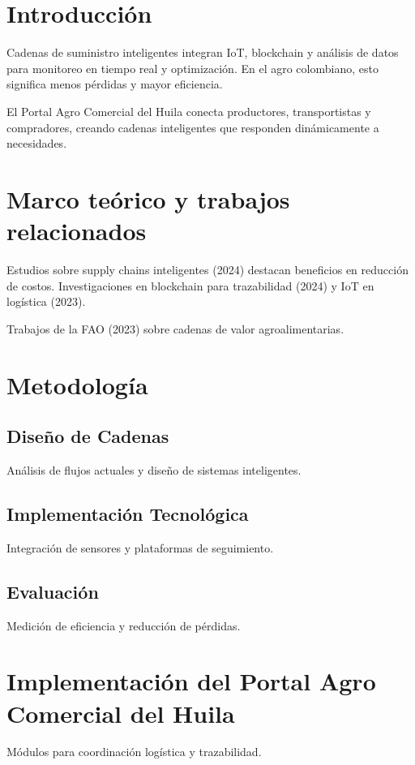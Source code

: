 \section{Introducción}

Cadenas de suministro inteligentes integran IoT, blockchain y análisis de datos para monitoreo en tiempo real y optimización. En el agro colombiano, esto significa menos pérdidas y mayor eficiencia.

El Portal Agro Comercial del Huila conecta productores, transportistas y compradores, creando cadenas inteligentes que responden dinámicamente a necesidades.

\section{Marco teórico y trabajos relacionados}

Estudios sobre supply chains inteligentes (2024) destacan beneficios en reducción de costos. Investigaciones en blockchain para trazabilidad (2024) y IoT en logística (2023).

Trabajos de la FAO (2023) sobre cadenas de valor agroalimentarias.

\section{Metodología}

\subsection{Diseño de Cadenas}
Análisis de flujos actuales y diseño de sistemas inteligentes.

\subsection{Implementación Tecnológica}
Integración de sensores y plataformas de seguimiento.

\subsection{Evaluación}
Medición de eficiencia y reducción de pérdidas.

\section{Implementación del Portal Agro Comercial del Huila}

Módulos para coordinación logística y trazabilidad.


